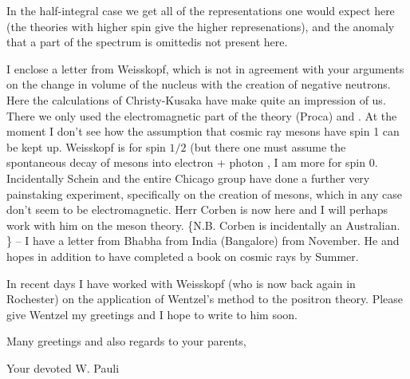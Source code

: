 In the half-integral case we get all of the representations one would expect here (the theories with higher spin give the higher represenations), and the anomaly that a part of the spectrum is omittedis not present here.

I enclose a letter from Weisskopf, which is not in agreement with your arguments on the change in volume of the nucleus with the creation of negative neutrons. Here the calculations of Christy-Kusaka have make quite an impression of us. There we only used the electromagnetic part of the theory (Proca) and . At the moment I don't see how the assumption that cosmic ray mesons have spin 1 can be kept up. Weisskopf is for spin $1/2$ (but there one must assume the spontaneous decay of mesons into electron + photon
, I am more for spin 0. Incidentally Schein and the entire Chicago group have done a further very painstaking experiment, specifically on the creation of mesons, which in any case don't seem to be electromagnetic. Herr Corben is now here and I will perhaps work with him on the meson theory. \{N.B. Corben is incidentally an Australian. \} -- I have a letter from Bhabha from India (Bangalore) from November. He  and hopes in addition to have completed a book on cosmic rays by Summer.

In recent days I have worked with Weisskopf (who is now back again in Rochester) on the application of Wentzel's method to the positron theory. Please give Wentzel my greetings and I hope to write to him soon.

Many greetings  and also regards to your parents,

Your devoted W. Pauli
